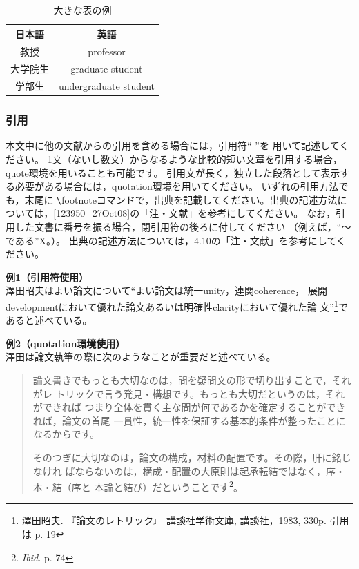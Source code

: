 \documentclass[b5paper,10pt,twocolumn,tombow]{jarticle}
\begin{document}
\begin{table}[ht!]
\begin{center}
\begin{tabular}{cc} \hline
日本語 &英語 \\ \hline
教授 & professor \\
大学院生 & graduate student \\
学部生 & undergraduate student \\ \hline
\end{tabular}
 \caption{大きな表の例}
\end{center}
\end{table}


\subsubsection{引用}
本文中に他の文献からの引用を含める場合には，引用符`` ''を
用いて記述してください。
1文（ないし数文）からなるような比較的短い文章を引用する場合，quote環境を用いることも可能です。
引用文が長く，独立した段落として表示する必要がある場合には，quotation環境を用いてください。
いずれの引用方法でも，末尾に
\verb|\|footnoteコマンドで，出典を記載してください。出典の記述方法に
ついては，\ref{123950_27Oct08}の「注・文献」を参考にしてください。
なお，引用した文書に番号を振る場合，閉引用符の後ろに付してください
（例えば，``～である''X。）。
出典の記述方法については，4.10の「注・文献」を参考にしてください。

\noindent{}\textbf{例1（引用符使用）}\\
澤田昭夫はよい論文について``よい論文は統一unity，連関coherence，
展開developmentにおいて優れた論文あるいは明確性clarityにおいて優れた論
文''\footnote{澤田昭夫. 『論文のレトリック』 講談社学術文庫, 講談社，1983, 330p. 引用は
p. 19}であると述べている。

\noindent{}\textbf{例2（quotation環境使用）}\\
澤田は論文執筆の際に次のようなことが重要だと述べている。
\begin{quotation}
論文書きでもっとも大切なのは，問を疑問文の形で切り出すことで，それがレ
 トリックで言う発見・構想です。もっとも大切だというのは，それができれば
 つまり全体を貫く主な問が何であるかを確定することができれば，論文の首尾
 一貫性，統一性を保証する基本的条件が整ったことになるからです。

そのつぎに大切なのは，論文の構成，材料の配置です。その際，肝に銘じなけれ
 ばならないのは，構成・配置の大原則は起承転結ではなく，序・本・結（序と
 本論と結び）だということです\footnote{\textit{Ibid.} p. 74}。
\end{quotation}
\end{document}
